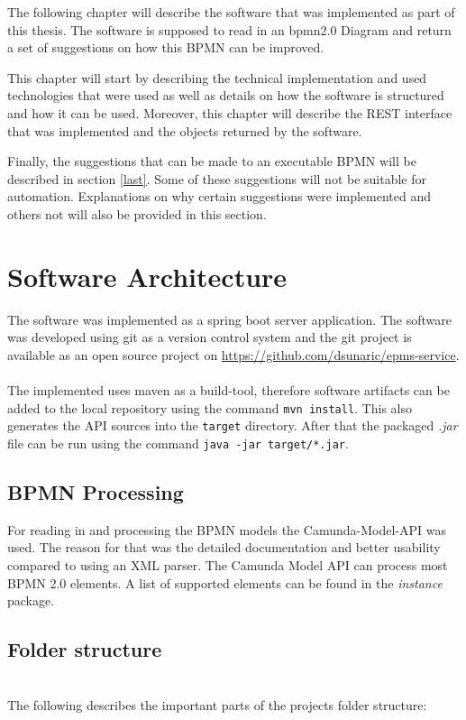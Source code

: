 \label{chapter-4}
The following chapter will describe the software that was implemented as part of this thesis. The software is supposed to read in an \gls{bpmn}2.0 Diagram and return a set of suggestions on how this BPMN can be improved.

This chapter will start by describing the technical implementation and used technologies that were used as well as details on how the software is structured and how it can be used. 
Moreover, this chapter will describe the REST interface that was implemented and the objects returned by the software. 

Finally, the suggestions that can be made to an executable BPMN will be described in section \ref{last}. Some of these suggestions will not be suitable for automation. Explanations on why certain suggestions were implemented and others not will also be provided in this section.
\section{Software Architecture}
The software was implemented as a spring boot server\cite{spring-boot} application. The software was developed using git\cite{git} as a version control system and the git project is available as an open source project on \url{https://github.com/dsunaric/epms-service}.\\~\\

The implemented uses maven\cite{maven} as a build-tool, therefore software artifacts can be added to the local repository using the command \verb|mvn install|. This also generates the API sources into the \verb|target| directory. After that the packaged \textit{.jar} file can be run using the command \verb|java -jar target/*.jar|. 


\subsection{BPMN Processing}
For reading in and processing the BPMN models the Camunda-Model-API\cite{camunda-model-api} was used. The reason for that was the detailed documentation and better usability compared to using an XML parser. The Camunda Model API can process most BPMN 2.0 elements. A list of supported elements can be found in the \textit{instance} package\cite{camunda-model-api-spoorted-elements}.
\subsection{Folder structure}~\\
The following describes the important parts of the projects folder structure:

